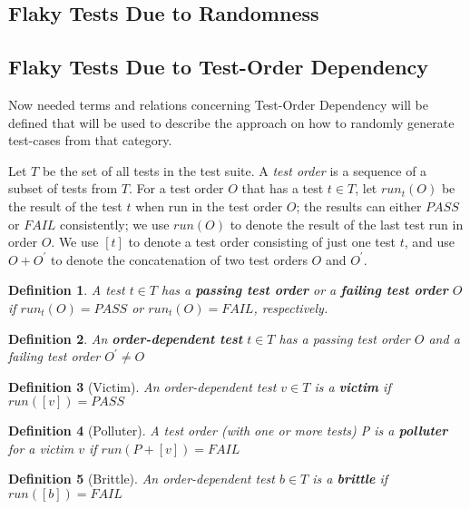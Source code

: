 \documentclass[
fancyheadings, %
%
%
]{stsreprt}
\newtheorem{definition}{Definition}
\begin{document}
\subsection{Flaky Tests Due to Randomness}

\subsection{Flaky Tests Due to Test-Order Dependency}
Now needed terms and relations concerning Test-Order Dependency will be defined that will be used to describe the approach on how to randomly generate test-cases from that category.\par

Let $T$ be the set of all tests in the test suite. A \textit{test order} is a sequence of a subset of tests from $T$. For a test order $O$ that has a test $t \in T$, let $run_{t}(O)$ be the result of the test $t$ when run in the test order $O$; the results can either $PASS$ or $FAIL$ consistently; we use $run(O)$ to denote the result of the last test run in order $O$. We use $[t]$ to denote a test order consisting of just one test $t$, and use $O + O^{'}$ to denote the concatenation of two test orders $O$ and $O^{'}$.

\begin{definition}
    A test $t \in T$ has a \textbf{passing test order} or a \textbf{failing test order} $O$ if $run_t(O) = PASS$ or $run_t(O) = FAIL$, respectively.
\end{definition}

\begin{definition}
    An \textbf{order-dependent test} $t \in T$ has a passing test order $O$ and a failing test order $O^{'} \neq O$
\end{definition}

\begin{definition}[Victim]
    An order-dependent test $v \in T$ is a \textbf{victim} if $run([v]) = PASS$
\end{definition} 

\begin{definition}[Polluter]
    A test order (with one or more tests) P is a \textbf{polluter} for a victim $v$ if $run(P + [v]) = FAIL$
\end{definition}

\begin{definition}[Brittle]
    An order-dependent test $b \in T$ is a \textbf{brittle} if $run([b]) = FAIL$
\end{definition}
\end{document}
